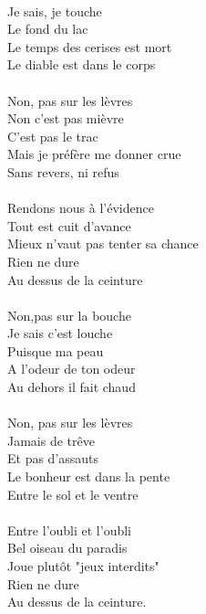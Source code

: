 \\Je sais, je touche
\\Le fond du lac
\\Le temps des cerises est mort
\\Le diable est dans le corps
\\\\Non, pas sur les lèvres
\\Non c'est pas mièvre
\\C'est pas le trac
\\Mais je préfère me donner crue
\\Sans revers, ni refus
\\\\Rendons nous à l'évidence
\\Tout est cuit d'avance
\\Mieux n'vaut pas tenter sa chance
\\Rien ne dure
\\Au dessus de la ceinture
\\\\Non,pas sur la bouche
\\Je sais c'est louche
\\Puisque ma peau
\\A l'odeur de ton odeur
\\Au dehors il fait chaud
\\\\Non, pas sur les lèvres
\\Jamais de trêve
\\Et pas d'assauts
\\Le bonheur est dans la pente
\\Entre le sol et le ventre
\\\\Entre l'oubli et l'oubli
\\Bel oiseau du paradis
\\Joue plutôt "jeux interdits"
\\Rien ne dure
\\Au dessus de la ceinture. 

\breakpage